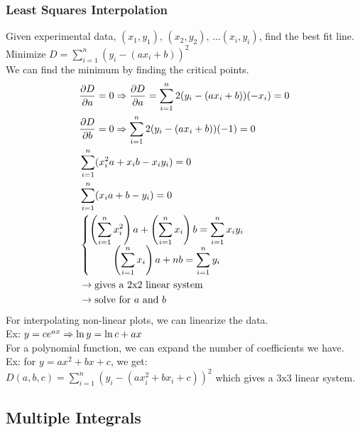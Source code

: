 \documentclass[11pt, fleqn]{article}
\begin{document}
\subsubsection{Least Squares Interpolation}
Given experimental data, $(x_1,y_1),\,(x_2,y_2),\,\ldots(x_i,y_i)$, find the best fit line.\\
Minimize $D=\sum\limits_{i=1}^n(y_i-(ax_i+b))^2$\\
We can find the minimum by finding the critical points.\\
\begin{align*}
    &\frac{\partial D}{\partial a}=0\Rightarrow\frac{\partial D}{\partial a}=\sum_{i=1}^n2(y_i-(ax_i+b))(-x_i)=0\\
    &\frac{\partial D}{\partial b}=0\Rightarrow\sum_{i=1}^n2(y_i-(ax_i+b))(-1)=0\\
    &\sum_{i=1}^n(x_i^2a+x_ib-x_iy_i)=0\\
    &\sum_{i=1}^n(x_ia+b-y_i)=0\\
    &\left\{\begin{matrix}
    \displaystyle{\left(\sum_{i=1}^nx_i^2\right)a+\left(\sum_{i=1}^nx_i\right)b=\sum_{i=1}^nx_iy_i}\\
    \displaystyle{\left(\sum_{i=1}^nx_i\right)a+nb=\sum_{i=1}^ny_i}
    \end{matrix}\right.\\
    &\to\text{gives a 2x2 linear system}\\
    &\to\text{solve for $a$ and $b$}
\end{align*}
For interpolating non-linear plots, we can linearize the data.\\
Ex: $y=ce^{ax}\Rightarrow\ln y=\ln c+ax$\\
For a polynomial function, we can expand the number of coefficients we have.\\
Ex: for $y=ax^2+bx+c$, we get:\\
$D(a,b,c)=\sum\limits_{i=1}^n(y_i-(ax_i^2+bx_i+c))^2$ which gives a 3x3 linear system.













\subsection{Multiple Integrals}
\end{document}
